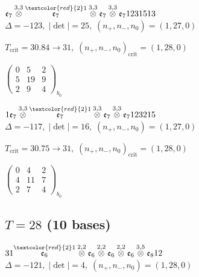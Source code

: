 \documentclass[10pt]{article}
\begin{document}
\smallskip

$\mathfrak{e}_7\overset{3,3}{\otimes}\overset{\textcolor{red}{2}1}{\mathfrak{e}_7}\overset{3,3}{\otimes}\mathfrak{e}_7\overset{3,3}{\otimes}\mathfrak{e}_71231513$ \quad $\Delta=-123,\; |\det|=25,\; (n_+,n_-,n_0)=(1,27,0)$

\hspace{1em}$T_{\text{crit}}=30.84 \to 31,\; (n_+,n_-,n_0)_{\text{crit}}=(1,28,0)$

\hspace{2em}$\left(\begin{smallmatrix}0 & 5 & 2 \\ 5 & 19 & 9 \\ 2 & 9 & 4\end{smallmatrix}\right)_{\!b_0}$

\smallskip

$1\mathfrak{e}_7\overset{3,3}{\otimes}\overset{\textcolor{red}{2}1}{\mathfrak{e}_7}\overset{3,3}{\otimes}\mathfrak{e}_7\overset{3,3}{\otimes}\mathfrak{e}_7123215$ \quad $\Delta=-117,\; |\det|=16,\; (n_+,n_-,n_0)=(1,27,0)$

\hspace{1em}$T_{\text{crit}}=30.75 \to 31,\; (n_+,n_-,n_0)_{\text{crit}}=(1,28,0)$

\hspace{2em}$\left(\begin{smallmatrix}0 & 4 & 2 \\ 4 & 11 & 7 \\ 2 & 7 & 4\end{smallmatrix}\right)_{\!b_0}$


\subsection*{$T = 28$ \quad (10 bases)}
\smallskip

$31\overset{\textcolor{red}{2}1}{\mathfrak{e}_6}\overset{2,2}{\otimes}\mathfrak{e}_6\overset{2,2}{\otimes}\mathfrak{e}_6\overset{2,2}{\otimes}\mathfrak{e}_6\overset{3,5}{\otimes}\mathfrak{e}_812$ \quad $\Delta=-121,\; |\det|=4,\; (n_+,n_-,n_0)=(1,28,0)$
\end{document}
